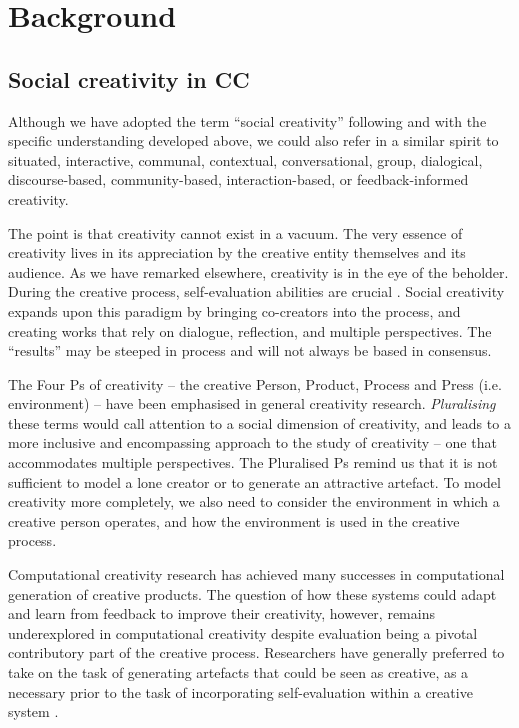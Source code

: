 \section{Background}
\label{background}

\subsection{Social creativity in CC}

Although we have adopted the term ``social creativity'' following
\cite{saunders12} and with the specific understanding developed above,
we could also refer in a similar spirit to situated, interactive,
communal, contextual, conversational, group, dialogical,
discourse-based, community-based, interaction-based, or
feedback-informed creativity.

The point is that creativity cannot exist in a vacuum.  The very
essence of creativity lives in its appreciation by the creative entity
themselves and its audience.  As we have remarked elsewhere,
creativity is in the eye of the beholder.  During the creative
process, self-evaluation abilities are crucial
\cite{poincare29,csik88}. Social creativity expands upon this
paradigm by bringing co-creators into the process, and creating works
that rely on dialogue, reflection, and multiple perspectives. The
``results'' may be steeped in process and will not always be based in
consensus.

The Four Ps of creativity -- the creative Person, Product, Process and
Press (i.e. environment) \cite{rhodes61,mackinnon70} -- have been
emphasised in general creativity research.  \emph{Pluralising} these
terms would call attention to a social dimension of creativity, and
leads to a more inclusive and encompassing approach to the study of
creativity -- one that accommodates multiple perspectives. The
Pluralised Ps remind us that it is not sufficient to model a lone
creator or to generate an attractive artefact.  To model creativity
more completely, we also need to consider the environment in which a
creative person operates, and how the environment is used in the
creative process.

Computational creativity research has achieved many successes in
computational generation of creative products. The question of how
these systems could adapt and learn from feedback to improve their
creativity, however, remains underexplored in computational creativity
despite evaluation being a pivotal contributory part of the creative
process. Researchers have generally preferred to take on the task of
generating artefacts that could be seen as creative, as a necessary
prior to the task of incorporating self-evaluation within a creative
system \cite{jordanous11iccc}.

